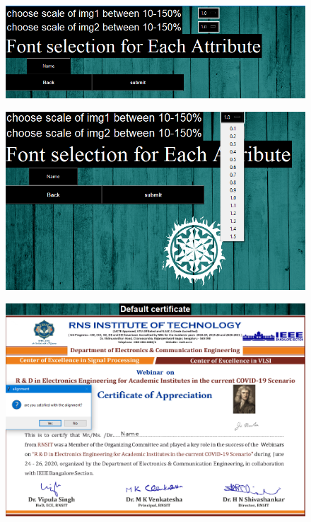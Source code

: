 \begin{figure}[H]
	\centering
	\includegraphics[width=0.75\linewidth]{"images/image_on_cert/Screenshot (90)"}
	\label{fig:screenshot-90}
\end{figure}
\begin{figure}[H]
	\centering
	\includegraphics[width=0.75\linewidth]{"images/image_on_cert/Screenshot (91)"}
	\label{fig:screenshot-91}
\end{figure}
\begin{figure}[H]
	\centering
	\includegraphics[width=0.75\linewidth]{"images/image_on_cert/Screenshot (96)"}
	\label{fig:screenshot-96}
\end{figure}

